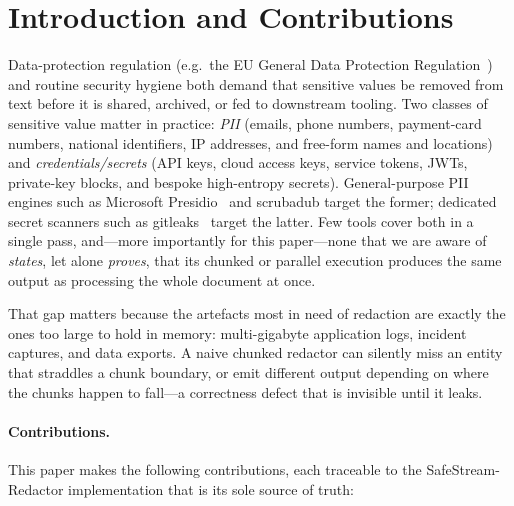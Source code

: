 \documentclass[runningheads]{llncs}
\begin{document}
\section{Introduction and Contributions}
\label{sec:intro}

Data-protection regulation (e.g.\ the EU General Data Protection
Regulation~\cite{gdpr}) and routine security hygiene both demand that sensitive
values be removed from text before it is shared, archived, or fed to downstream
tooling. Two classes of sensitive value matter in practice: \emph{PII}
(emails, phone numbers, payment-card numbers, national identifiers, IP
addresses, and free-form names and locations) and \emph{credentials/secrets}
(API keys, cloud access keys, service tokens, JWTs, private-key blocks, and
bespoke high-entropy secrets). General-purpose PII engines such as Microsoft
Presidio~\cite{presidio} and scrubadub target the former; dedicated secret
scanners such as gitleaks~\cite{gitleaks} target the latter. Few tools cover
both in a single pass, and---more importantly for this paper---none that we are
aware of \emph{states}, let alone \emph{proves}, that its chunked or parallel
execution produces the same output as processing the whole document at once.

That gap matters because the artefacts most in need of redaction are exactly the
ones too large to hold in memory: multi-gigabyte application logs, incident
captures, and data exports. A naive chunked redactor can silently miss an entity
that straddles a chunk boundary, or emit different output depending on where the
chunks happen to fall---a correctness defect that is invisible until it leaks.

\paragraph{Contributions.}
This paper makes the following contributions, each traceable to the
SafeStream-Redactor implementation that is its sole source of truth:
\end{document}
